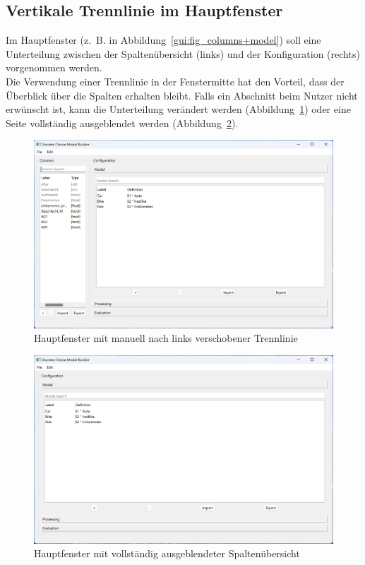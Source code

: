 \documentclass{article}
\begin{document}
\subsection{Vertikale Trennlinie im Hauptfenster}
Im Hauptfenster (z.~B. in Abbildung~\ref{gui:fig_columns+model}) soll eine Unterteilung zwischen der Spaltenübersicht (links) und der Konfiguration (rechts) vorgenommen werden.\\

Die Verwendung einer Trennlinie in der Fenstermitte hat den Vorteil, dass der Überblick über die Spalten erhalten bleibt. Falls ein Abschnitt beim Nutzer nicht erwünscht ist, kann die Unterteilung verändert werden (Abbildung~\ref{gui:fig_splitter1}) oder eine Seite vollständig ausgeblendet werden (Abbildung~\ref{gui:fig_splitter2}).\\

\begin{figure}[H]%
  \centering
  \includegraphics[width=12cm]{specifications/img/gui-screenshots/splitter1.png}
  \caption{Hauptfenster mit manuell nach links verschobener Trennlinie}
  \label{gui:fig_splitter1}
\end{figure}

\begin{figure}[H]%
  \centering
  \includegraphics[width=12cm]{specifications/img/gui-screenshots/model.png}
  \caption{Hauptfenster mit vollständig ausgeblendeter Spaltenübersicht}
  \label{gui:fig_splitter2}
\end{figure}
\end{document}
